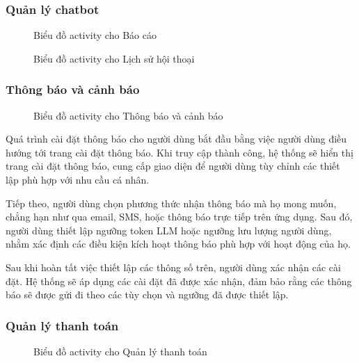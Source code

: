 \subsubsection{Quản lý chatbot}
\begin{figure}[H]
    \centering
     
    \vspace{0.5cm}
    \caption{Biểu đồ activity cho Báo cáo}
    \label{fig:enter-label}
\end{figure}
\begin{figure}[H]
    \centering
     
    \vspace{0.5cm}
    \caption{Biểu đồ activity cho Lịch sử hội thoại}
    \label{fig:enter-label}
\end{figure}

\subsubsection{Thông báo và cảnh báo}
\begin{figure}[H]
    \centering
     
    \vspace{0.5cm}
    \caption{Biểu đồ activity cho Thông báo và cảnh báo}
    \label{fig:enter-label}
\end{figure}

\par Quá trình cài đặt thông báo cho người dùng bắt đầu bằng việc người dùng điều hướng tới trang cài đặt thông báo. Khi truy cập thành công, hệ thống sẽ hiển thị trang cài đặt thông báo, cung cấp giao diện để người dùng tùy chỉnh các thiết lập phù hợp với nhu cầu cá nhân.

Tiếp theo, người dùng chọn phương thức nhận thông báo mà họ mong muốn, chẳng hạn như qua email, SMS, hoặc thông báo trực tiếp trên ứng dụng. Sau đó, người dùng thiết lập ngưỡng token LLM hoặc ngưỡng lưu lượng người dùng, nhằm xác định các điều kiện kích hoạt thông báo phù hợp với hoạt động của họ.

Sau khi hoàn tất việc thiết lập các thông số trên, người dùng xác nhận các cài đặt. Hệ thống sẽ áp dụng các cài đặt đã được xác nhận, đảm bảo rằng các thông báo sẽ được gửi đi theo các tùy chọn và ngưỡng đã được thiết lập.

\subsubsection{Quản lý thanh toán}
\begin{figure}[H]
    \centering
     
    \vspace{0.5cm}
    \caption{Biểu đồ activity cho Quản lý thanh toán}
    \label{fig:enter-label}
\end{figure}

